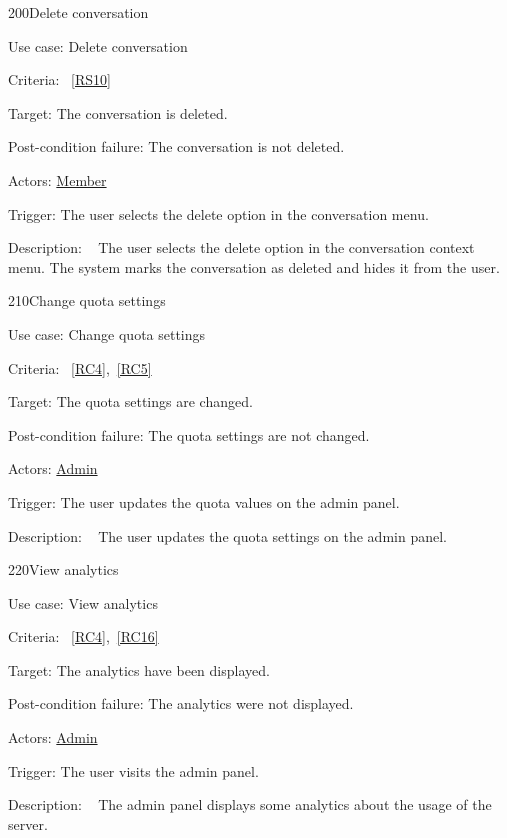 \vspace{2.0em}

\begin{function}{200}{Delete conversation}
	\item[Use case:] Delete conversation
	\item[Criteria:]~\ref{RS10}
	\item[Target:] The conversation is deleted.
	\item[Post-condition failure:] The conversation is not deleted.
	\item[Actors:] \hyperref[def:member]{Member}
	\item[Trigger:] The user selects the delete option in the conversation menu.
	\item[Description:] ~
	The user selects the delete option in the conversation context menu.
	The system marks the conversation as deleted and hides it from the user.
\end{function}

\vspace{2.0em}

\begin{function}{210}{Change quota settings}
	\item[Use case:] Change quota settings
	\item[Criteria:]~\ref{RC4},~\ref{RC5}
	\item[Target:] The quota settings are changed.
	\item[Post-condition failure:] The quota settings are not changed.
	\item[Actors:] \hyperref[def:admin]{Admin}
	\item[Trigger:] The user updates the quota values on the admin panel.
	\item[Description:] ~
	The user updates the quota settings on the admin panel.
\end{function}
\vspace{2.0em}

\newpage

\begin{function}{220}{View analytics}
	\item[Use case:] View analytics
	\item[Criteria:]~\ref{RC4},~\ref{RC16}
	\item[Target:] The analytics have been displayed.
	\item[Post-condition failure:] The analytics were not displayed.
	\item[Actors:] \hyperref[def:admin]{Admin}
	\item[Trigger:] The user visits the admin panel.
	\item[Description:] ~
	The admin panel displays some analytics about the usage of the server.
\end{function}

